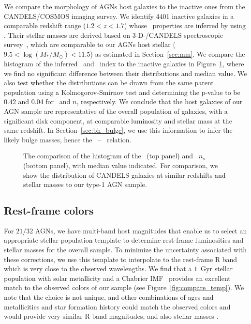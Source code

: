 \documentclass[apj]{emulateapj}
\begin{document}
We compare the morphology of AGNs host galaxies to the inactive ones from the CANDELS/COSMOS imaging survey. We identify 4401 inactive galaxies in a comparable redshift range ($1.2<z<1.7$) whose \sersic\ properties are inferred by \citet{VDwel++2012} using \galfit. Their stellar masses are derived based on 3-D-\hst/CANDELS spectroscopic survey~\citep{Momcheva2016, Brammer2012}, which are comparable to our AGNs host stellar ($9.5< \log (M_* /M_{\odot})< 11.5$) as estimated in Section~\ref{sec:mm}. We compare the histogram of the inferred \Reff\ and \sersic\ index to the inactive galaxies in Figure~\ref{fig:hist_rn}, where we find no significant difference between their distributions and median value. We also test whether the distributions can be drawn from the same parent population using a Kolmogorov-Smirnov test and determining the p-value to be 0.42 and 0.04 for \Reff\ and $n$, respectively. We conclude that the host galaxies of our AGN sample are representative of the overall population of galaxies, with a significant disk component, at comparable luminosity and stellar mass at the same redshift. In Section~\ref{sec:bh_bulge}, we use this information to infer the likely bulge masses, hence the \mbh\ -- \bmass\ relation.


\begin{figure}[ht]
\caption{\label{fig:hist_rn} 
The comparison of the histogram of the \Reff\ (top panel) and \sersic\ $n_s$ (bottom panel), with median value indicated. For comparison, we show the distribution of CANDELS galaxies at similar redshifts and stellar masses to our type-1 AGN sample.}
\end{figure} 

\subsection{Rest-frame colors}

For $21/32$ AGNs, we have multi-band host magnitudes that enable us to select an appropriate stellar population template to determine rest-frame luminosities and stellar masses for the overall sample. To minimize the uncertainty associated with these corrections, we use this template to interpolate to the rest-frame R band which is very close to the observed wavelengths.  We find that a $1$~Gyr stellar population with solar metallicity and a Chabrier IMF~\citep{Bruzual2003} provides an excellent match to the observed colors of our sample (see Figure~\ref{fig:compare_temp}). We note that the choice is not unique, and other combinations of ages and metallicities and star formation history could match the observed colors and would provide very similar R-band magnitudes, and also stellar masses \citep{Bell2000, Bell2001}. %
\end{document}
